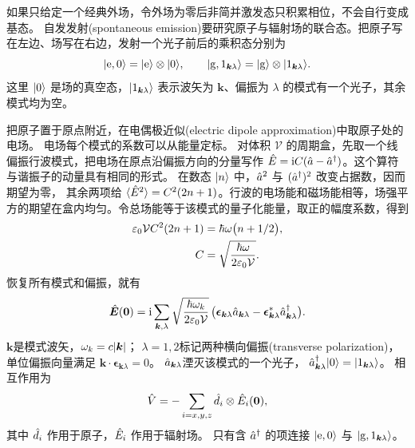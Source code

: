 如果只给定一个经典外场，令外场为零后非简并激发态只积累相位，不会自行变成基态。
自发发射(spontaneous emission)要研究原子与辐射场的联合态。把原子写在左边、场写在右边，发射一个光子前后的乘积态分别为
\[
    \lvert\mathrm{e},0\rangle = \lvert\mathrm{e}\rangle \otimes \lvert0\rangle,\qquad
    \lvert\mathrm{g},1_{\bm k\lambda}\rangle = \lvert\mathrm{g}\rangle \otimes \lvert1_{\bm k\lambda}\rangle .
\]
这里 $\lvert0\rangle$ 是场的真空态，$\lvert1_{\bm k\lambda}\rangle$ 表示波矢为 $\bm k$、偏振为 $\lambda$ 的模式有一个光子，其余模式均为空。

把原子置于原点附近，在电偶极近似(electric dipole approximation)中取原子处的电场。
电场每个模式的系数可以从能量定标。
对体积 $\mathcal V$ 的周期盒，先取一个线偏振行波模式，把电场在原点沿偏振方向的分量写作
$\hat{E} = \mathrm{i} C(\hat{a} - \hat{a}^\dagger)$。这个算符与谐振子的动量具有相同的形式。
在数态 $\lvert n\rangle$ 中，$\hat{a}^2$ 与 $(\hat{a}^\dagger)^2$ 改变占据数，因而期望为零，
其余两项给 $\langle\hat{E}^2\rangle = C^2(2n + 1)$。行波的电场能和磁场能相等，场强平方的期望在盒内均匀。令总场能等于该模式的量子化能量，取正的幅度系数，得到
\begin{subequations}
    \begin{align}
        \varepsilon_0\mathcal V C^2(2n + 1)
          &= \hbar\omega\bigl(n + 1/2\bigr),\\
        C &= \sqrt{\frac{\hbar\omega}{2\varepsilon_0\mathcal V}} .
    \end{align}
\end{subequations}
恢复所有模式和偏振，就有
\begin{equation}
    \hat{\bm{E}}(\bm0)
    = \mathrm{i}\sum_{\bm k,\lambda}
    \sqrt{\frac{\hbar\omega_k}{2\varepsilon_0\mathcal V}}\,
    \bigl(\bm\epsilon_{\bm k\lambda}\hat{a}_{\bm k\lambda}
        - \bm\epsilon_{\bm k\lambda}^\ast\hat{a}_{\bm k\lambda}^\dagger\bigr).
\end{equation}
$\bm k$是模式波矢，$\omega_k = c\lvert\bm k\rvert$；
$\lambda = 1,2$标记两种横向偏振(transverse polarization)，单位偏振向量满足
$\bm k \cdot \bm\epsilon_{\bm k\lambda} = 0$。
$\hat{a}_{\bm k\lambda}$湮灭该模式的一个光子，
$\hat{a}^\dagger_{\bm k\lambda}\lvert0\rangle = \lvert1_{\bm k\lambda}\rangle$。
相互作用为
\begin{equation}\label{eq:qm-quantized-dipole-interaction}
    \hat{V} = -\sum_{i=x,y,z}\hat{d}_i \otimes \hat{E}_i(\bm0),
\end{equation}
其中 $\hat{d}_i$ 作用于原子，$\hat{E}_i$ 作用于辐射场。
只有含 $\hat{a}^\dagger$ 的项连接 $\lvert\mathrm{e},0\rangle$ 与 $\lvert\mathrm{g},1_{\bm k\lambda}\rangle$。


